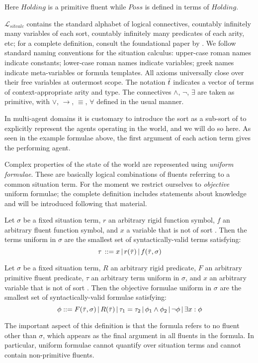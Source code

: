 Here $Holding$ is a primitive fluent while $Poss$ is defined in
terms of $Holding$.\medskip{}


$\mathcal{L}_{sitcalc}$ contains the standard alphabet of logical
connectives, countably infinitely many variables of each sort, countably
infinitely many predicates of each arity, etc; for a complete definition,
consult the foundational paper by \citet{pirri99contributions_sitcalc}.
We follow standard naming conventions for the situation calculus:
upper-case roman names indicate constants; lower-case roman names
indicate variables; greek names indicate meta-variables or formula
templates. All axioms universally close over their free variables
at outermost scope. The notation $\bar{t}$ indicates a vector of
terms of context-appropriate arity and type. The connectives $\wedge$,
$\neg$, $\exists$ are taken as primitive, with $\vee$, $\rightarrow$,
$\equiv$, $\forall$ defined in the usual manner.

In multi-agent domains it is customary to introduce the sort as a sub-sort of  to explicitly represent the agents
operating in the world, and we will do so here. As seen in the example
formulae above, the first argument of each action term gives the performing
agent.

\medskip{}
 Complex properties of the state of the world are represented using
\emph{uniform formulae}. These are basically logical combinations
of fluents referring to a common situation term. For the moment we
restrict ourselves to \emph{objective} uniform formulae; the complete
definition includes statements about knowledge and will be introduced
following that material.

\begin{defnL}
 Let $\sigma$ be a fixed situation term,
$r$ an arbitrary rigid function symbol, $f$ an arbitrary fluent
function symbol, and $x$ a variable that is not of sort .
Then the terms uniform in $\sigma$ are the smallest set of syntactically-valid
terms satisfying:\[
\tau\,::=x\,|\, r(\bar{\tau})\,|\, f(\bar{\tau},\sigma)\]

\begin{defnL}
 Let $\sigma$ be a fixed
situation term, $R$ an arbitrary rigid predicate, $F$ an arbitrary
primitive fluent predicate, $\tau$ an arbitrary term uniform in $\sigma$,
and $x$ an arbitrary variable that is not of sort .
Then the objective formulae uniform in $\sigma$ are the smallest
set of syntactically-valid formulae satisfying:\[
\phi::=F(\bar{\tau},\sigma)\,|\, R(\bar{\tau})\,|\,\tau_{1}=\tau_{2}\,|\,\phi_{1}\wedge\phi_{2}\,|\,\neg\phi\,|\,\exists x:\phi\]

\end{defnL}
\end{defnL}
The important aspect of this definition is that the formula refers
to no fluent other than $\sigma$, which appears as the final argument
in all fluents in the formula. In particular, uniform formulae cannot
quantify over situation terms and cannot contain non-primitive fluents.

